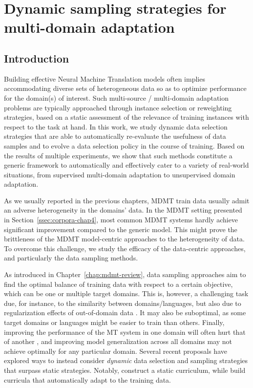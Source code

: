 \chapter{Dynamic sampling strategies for multi-domain adaptation} \label{chap:mdac}
\section{Introduction}
Building effective Neural Machine Translation models often implies accommodating diverse sets of heterogeneous data so as to optimize performance for the domain(s) of interest. Such multi-source / multi-domain adaptation problems are typically approached through instance selection or reweighting strategies, based on a static assessment of the relevance of training instances with respect to the task at hand. In this work, we study dynamic data selection strategies that are able to automatically re-evaluate the usefulness of data samples and to evolve a data selection policy in the course of training. Based on the results of multiple experiments, we show that such methods constitute a generic framework to automatically and effectively cater to a variety of real-world situations, from supervised multi-domain adaptation to unsupervised domain adaptation. 

As we usually reported in the previous chapters, MDMT train data usually admit an adverse heterogeneity in the domains' data. In the MDMT setting presented in Section~\ref{ssec:corpora-chap4}, most common MDMT systems hardly achieve significant improvement compared to the generic model. This might prove the brittleness of the MDMT model-centric approaches to the heterogeneity of data. To overcome this challenge, we study the efficacy of the data-centric approaches, and particularly the data sampling methods.

As introduced in Chapter~\ref{chap:mdmt-review}, data sampling approaches aim to find the optimal balance of training data with respect to a certain objective, which can be one or multiple target domains. This is, however, a challenging task due, for instance, to the similarity between domains/languages, but also due to regularization effects of out-of-domain data \citep{Miceli17regularization}. It may also be suboptimal, as some target domains or languages might be easier to train than others. Finally, improving the performance of the MT system in one domain will often hurt that of another \citep{Wees17dynamic, Britz17effective}, and improving model generalization across all domains \citep{koehn18findings} may not achieve optimally for any particular domain. Several recent proposals have explored ways to instead consider \emph{dynamic} data selection and sampling strategies that surpass static strategies. Notably, \citet{Wees17dynamic,Zhang19curriculum} construct a static curriculum, while \citet{Graves17automated,Platanios19competence,Kumar19reinforcement,Wang20learning-multi,Wang20balancing} build curricula that automatically adapt to the training data.

